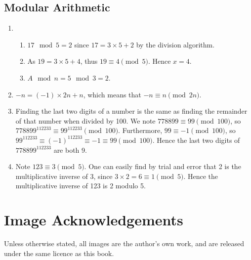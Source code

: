 \section{Modular Arithmetic}
\begin{enumerate}
    \item \begin{enumerate}[label=(\alph*)]
        \item $17 \mod 5 = 2$ since $17 = 3 \times 5 + 2$ by the division algorithm.
        \item As $19 = 3 \times 5 + 4$, thus $19 \equiv 4 \pmod 5$. Hence $x = 4$.
        \item $A \mod n = 5 \mod 3 = 2$.
    \end{enumerate}
    \item $-n = (-1) \times 2n + n$, which means that $-n \equiv n \pmod{2n}$.
    \item Finding the last two digits of a number is the same as finding the remainder of that number when divided by 100. We note $778899 \equiv 99 \pmod{100}$, so $778899^{112233} \equiv 99^{112233} \pmod{100}$. Furthermore, $99 \equiv -1 \pmod{100}$, so $99^{112233}\equiv (-1)^{112233} \equiv -1 \equiv 99 \pmod{100}$. Hence the last two digits of $778899^{112233}$ are both 9.
    \item Note $123 \equiv 3 \pmod 5$. One can easily find by trial and error that 2 is the multiplicative inverse of 3, since $3 \times 2 = 6 \equiv 1 \pmod 5$. Hence the multiplicative inverse of 123 is 2 modulo 5.
\end{enumerate}

\chapter{Image Acknowledgements}
Unless otherwise stated, all images are the author's own work, and are released under the same licence as this book.

\printbibliography[heading=bibintoc, title={References and Bibliography}]
\printindex


